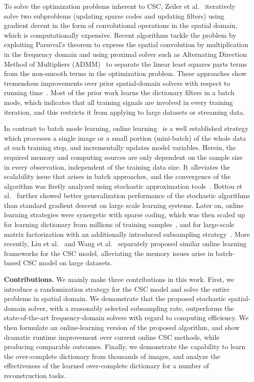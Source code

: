 To solve the optimization problems inherent to CSC, Zeiler et
al.~\cite{zeiler2010deconvolutional} iteratively solve two subproblems
(updating sparse codes and updating filters) using gradient decent in
the form of convolutional operations in the spatial domain, which is
computationally expensive. Recent algorithms tackle the problem by
exploiting Parseval's theorem to express the spatial convolution by
multiplication in the frequency domain and using proximal solver such
as Alternating Direction Method of Multipliers
(ADMM)~\cite{boyd2011distributed} to separate the linear least squares
parts terms from the non-smooth terms in the optimization
problem. These approaches show tremendous improvements over prior
spatial-domain solvers with respect to running
time~\cite{bristow2013fast,heide2015fast,wohlberg2016efficient,choudhury2017consensus}. Most
of the prior work learns the dictionary filters in a batch mode, which
indicates that all training signals are involved in every training
iteration, and this restricts it from applying to large datasets or
streaming data.

In contrast to batch mode learning, online
learning~\cite{shalev2012online} is a well established strategy which
processes a single image or a small portion (mini-batch) of the whole
data at each training step, and incrementally updates model
variables. Herein, the required memory and computing sources are only
dependent on the sample size in every observation, independent of the
training data size. It alleviates the scalability issue that arises in
batch approaches, and the convergence of the algorithm was firstly
analyzed using stochastic approximation
tools~\cite{bottou1998online}. Bottou et
al.~\cite{bousquet2008tradeoffs} further showed better generalization
performance of the stochastic algorithms than standard gradient
descent on large scale learning systems. Later on, online learning
strategies were synergetic with sparse coding, which was then scaled
up for learning dictionary from millions of training
samples~\cite{mairal2009online,mairal2010online}, and for large-scale
matrix factorization with an additionally introduced subsampling
strategy~\cite{mensch2016dictionary}. More recently, Liu et
al.~\cite{liu-2018-first} and Wang et al.~\cite{wang2018scalable}
separately proposed similar online learning frameworks for the CSC
model, alleviating the memory issues arise in batch-based CSC model on
large datasets.

{\bfseries Contributions.} We mainly make three contributions in this
work. First, we introduce a randomization strategy for the CSC
model and solve the entire problems in spatial domain. We demonstrate
that the proposed stochastic spatial-domain solver, with a reasonably
selected subsampling rate, outperforms the state-of-the-art
frequency-domain solvers with regard to computing efficiency. We then
formulate an online-learning version of the proposed algorithm, and 
show dramatic runtime improvement over current online CSC methods,
while producing comparable outcomes. Finally, we demonstrate the
capability to learn the over-complete dictionary from thousands of
images, and analyze the effectiveness of the learned over-complete
dictionary for a number of reconstruction tasks.



